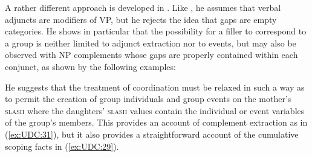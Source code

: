 \documentclass[output=paper
,notxmath 
 	        ,biblatex
                ,babelshorthands
                ,newtxmath
                ,draftmode
                ,colorlinks, citecolor=brown
]{langscibook}
\begin{document}
A rather different approach is developed in \citet{Chaves:09}. Like
\citet[Chapter~3]{Levine:Hukari:06}, he assumes that verbal adjuncts are
modifiers of VP, but he rejects the idea that gaps are empty
categories. He shows in particular that the possibility for a filler
to correspond to a group is neither limited to adjunct extraction nor
to events, but may also be observed with NP complements whose gaps are
properly contained within each conjunct, as shown by the following
examples:

\begin{exe} \ex \begin{xlist} \label{ex:UDC:31}


\end{xlist}
\end{exe}


\noindent
He suggests that the treatment of coordination must be relaxed in such
a way as to permit the creation of group individuals and group events
on the mother's \textsc{slash} where the daughters' \textsc{slash}
values contain the individual or event variables of the group's
members.  This provides an account of complement extraction as in
(\ref{ex:UDC:31}), but it also provides a
straightforward account of the cumulative scoping facts in
(\ref{ex:UDC:29}).
 



\end{document}
